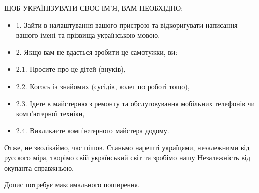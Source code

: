 ЩОБ УКРАЇНІЗУВАТИ СВОЄ ІМ'Я, ВАМ НЕОБХІДНО:

\begin{itemize}
  \item 1. Зайти в налаштування вашого пристрою та відкоригувати написання вашого імені та прізвища українською мовою. 
  \item 2. Якщо вам не вдається зробити це самотужки, ви:
  \item 2.1. Просите про це дітей (внуків), 
  \item 2.2. Когось із знайомих (сусідів, колег по роботі тощо), 
  \item 2.3. Ідете в майстерню з ремонту та обслуговування мобільних телефонів чи комп'ютерної техніки,
  \item 2.4. Викликаєте комп'ютерного майстера додому. 
\end{itemize}

Отже, не зволікаймо, час пішов. Станьмо нарешті україцями, незалежними від
русского міра, творімо свій український світ та зробімо нашу Незалежність від
окупанта справжньою. 

Допис потребує максимального поширення.

